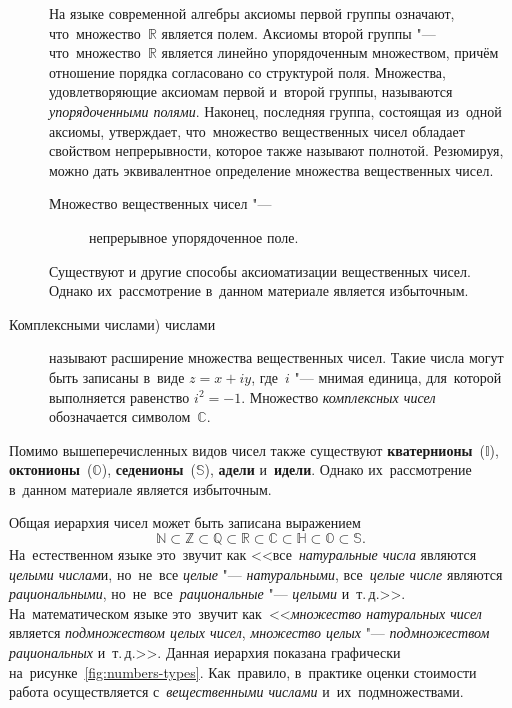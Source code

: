 \documentclass[]{scrartcl}
\begin{document}
\begin{description}
	На языке современной алгебры аксиомы первой группы означают, что~множество~${\displaystyle \mathbb {R} }$ является полем. Аксиомы второй группы "--- что~множество~${\displaystyle \mathbb {R} }$ является линейно упорядоченным множеством, причём отношение порядка согласовано со структурой поля. Множества, удовлетворяющие аксиомам первой и~второй группы, называются \emph{упорядоченными полями}. Наконец, последняя группа, состоящая из~одной аксиомы, утверждает, что~множество вещественных чисел обладает свойством непрерывности, которое также называют полнотой. Резюмируя, можно дать эквивалентное определение множества вещественных чисел.
	\begin{description}
		\item[Множество вещественных чисел "---] непрерывное упорядоченное поле.
	\end{description} 
	Существуют и другие способы аксиоматизации вещественных чисел. Однако их~рассмотрение в~данном материале является избыточным.
	\item[Комплексными числами) числами] называют расширение множества вещественных чисел. Такие числа могут быть записаны в~виде $z=x+iy$, где~$i$ "--- мнимая единица, для~которой выполняется равенство $i^2=-1$. Множество \emph{комплексных чисел} обозначается символом~$\mathbb{C}$. 
\end{description} 
Помимо вышеперечисленных видов чисел также существуют \textbf{кватернионы}~($\mathbb{I}$), \textbf{октонионы}~($\mathbb{O}$), \textbf{седенионы}~($\mathbb{S}$), \textbf{адели} и~\textbf{идели}. Однако их~рассмотрение в~данном материале является избыточным. 

Общая иерархия чисел может быть записана выражением
\begin{equation}\label{eq:numbers-hierarchy}
\mathbb{N} \subset \mathbb{Z} \subset \mathbb{Q} \subset \mathbb{R} \subset \mathbb{C} \subset \mathbb{H} \subset \mathbb{O} \subset \mathbb{S}.
\end{equation}
На~естественном языке это~звучит как <<все~\emph{натуральные числа} являются \emph{целыми числам}и, но~не~все \emph{целые} "--- \emph{натуральными}, все~\emph{целые числе} являются \emph{рациональными}, но~не~все~\emph{рациональные} "--- \emph{целыми} и~т.\,д.>>. На~математическом языке это~звучит как~<<\emph{множество натуральных чисел} является \emph{подмножеством целых чисел}, \emph{множество целых} "--- \emph{подмножеством рациональных} и~т.\,д.>>. Данная иерархия показана графически на~рисунке~\ref{fig:numbers-types}. Как~правило, в~практике оценки стоимости работа осуществляется с~\emph{вещественными числами} и~их~подмножествами.
\end{document}
